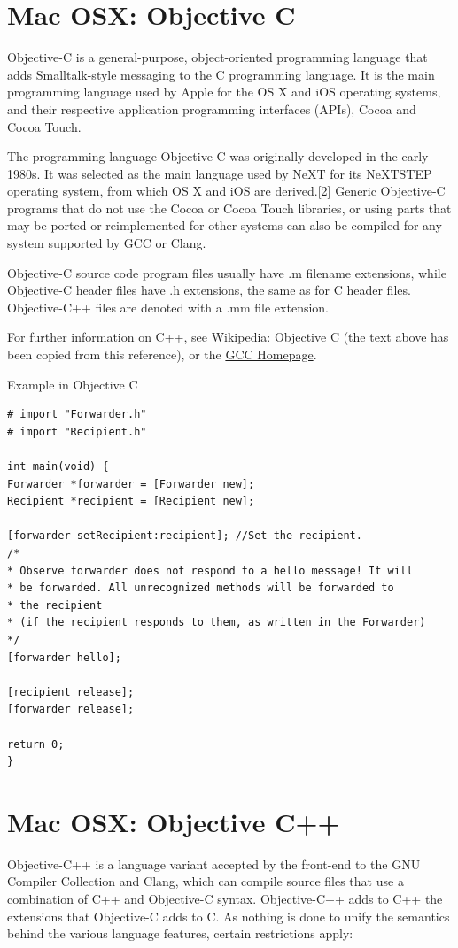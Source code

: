 \newpage
\section{Mac OSX: Objective C}
Objective-C is a general-purpose, object-oriented programming language that adds Smalltalk-style messaging to the C programming language. It is the main programming language used by Apple for the OS X and iOS operating systems, and their respective application programming interfaces (APIs), Cocoa and Cocoa Touch.

\vpara
The programming language Objective-C was originally developed in the early 1980s. It was selected as the main language used by NeXT for its NeXTSTEP operating system, from which OS X and iOS are derived.[2] Generic Objective-C programs that do not use the Cocoa or Cocoa Touch libraries, or using parts that may be ported or reimplemented for other systems can also be compiled for any system supported by GCC or Clang.

\vpara
Objective-C source code program files usually have .m filename extensions, while Objective-C header files have .h extensions, the same as for C header files. Objective-C++ files are denoted with a .mm file extension.


\vpara
For further information on C++, see \href{http://en.wikipedia.org/wiki/Objective-C}{Wikipedia: Objective C} (the text above has been copied from this reference), or the  \href{http://gcc.gnu.org/}{GCC Homepage}.



\vpara
Example in Objective C

\begin{lstlisting}
# import "Forwarder.h"
# import "Recipient.h"

int main(void) {
Forwarder *forwarder = [Forwarder new];
Recipient *recipient = [Recipient new];

[forwarder setRecipient:recipient]; //Set the recipient.
/*
* Observe forwarder does not respond to a hello message! It will
* be forwarded. All unrecognized methods will be forwarded to
* the recipient
* (if the recipient responds to them, as written in the Forwarder)
*/
[forwarder hello];

[recipient release];
[forwarder release];

return 0;
}
\end{lstlisting}




\newpage
\section{Mac OSX: Objective C++}
Objective-C++ is a language variant accepted by the front-end to the GNU Compiler Collection and Clang, which can compile source files that use a combination of C++ and Objective-C syntax. Objective-C++ adds to C++ the extensions that Objective-C adds to C. As nothing is done to unify the semantics behind the various language features, certain restrictions apply:

